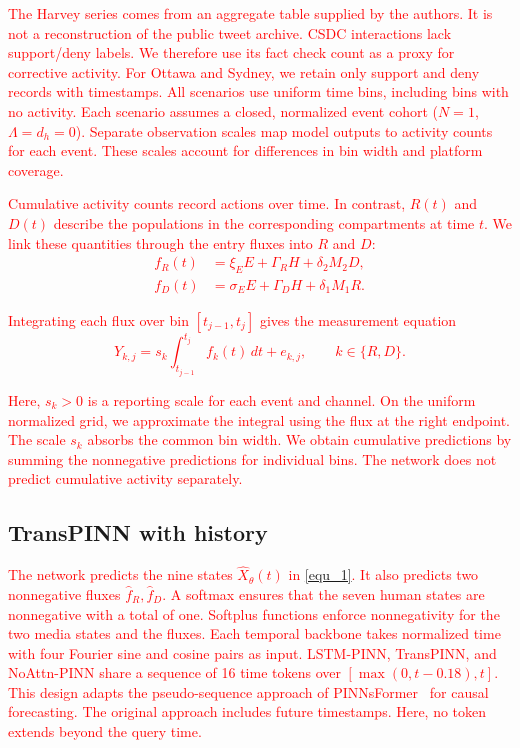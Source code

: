 \documentclass[letterpaper,journal]{IEEEtran}
\begin{document}
\textcolor{red}{
The Harvey series comes from an aggregate table supplied by the authors. It is not a reconstruction of the public tweet archive. CSDC interactions lack support/deny labels. We therefore use its fact check count as a proxy for corrective activity. For Ottawa and Sydney, we retain only support and deny records with timestamps. All scenarios use uniform time bins, including bins with no activity.
Each scenario assumes a closed, normalized event cohort ($N=1$, $\Lambda=d_h=0$). Separate observation scales map model outputs to activity counts for each event. These scales account for differences in bin width and platform coverage.
}

\textcolor{red}{
Cumulative activity counts record actions over time. In contrast, $R(t)$ and $D(t)$ describe the populations in the corresponding compartments at time $t$. We link these quantities through the entry fluxes into $R$ and $D$:
\begin{equation}
	\begin{aligned}
	f_R(t)&=\xi_EE+\Gamma_RH+\delta_2M_2D,\\
	f_D(t)&=\sigma_EE+\Gamma_DH+\delta_1M_1R.
	\end{aligned}
	\label{eq:cumulative_observation}
\end{equation}
}

\textcolor{red}{
Integrating each flux over bin $[t_{j-1},t_j]$ gives the measurement equation
\begin{equation}
Y_{k,j}=s_k\int_{t_{j-1}}^{t_j} f_k(t)\,dt+e_{k,j},
\qquad k\in\{R,D\}.
\label{eq:binned_observation}
\end{equation}
}

\textcolor{red}{
Here, $s_k>0$ is a reporting scale for each event and channel. On the uniform normalized grid, we approximate the integral using the flux at the right endpoint. The scale $s_k$ absorbs the common bin width. We obtain cumulative predictions by summing the nonnegative predictions for individual bins. The network does not predict cumulative activity separately.
}

	\subsection{TransPINN with history}


\textcolor{red}{
The network predicts the nine states $\widehat X_\theta(t)$ in \eqref{equ_1}. It also predicts two nonnegative fluxes $\widehat f_R,\widehat f_D$. A softmax ensures that the seven human states are nonnegative with a total of one. Softplus functions enforce nonnegativity for the two media states and the fluxes.
Each temporal backbone takes normalized time with four Fourier sine and cosine pairs as input. LSTM-PINN, TransPINN, and NoAttn-PINN share a sequence of 16 time tokens over $[\max(0,t-0.18),t]$. This design adapts the pseudo-sequence approach of PINNsFormer~\cite{zhao2024pinnsformer} for causal forecasting. The original approach includes future timestamps. Here, no token extends beyond the query time.
}
\end{document}
